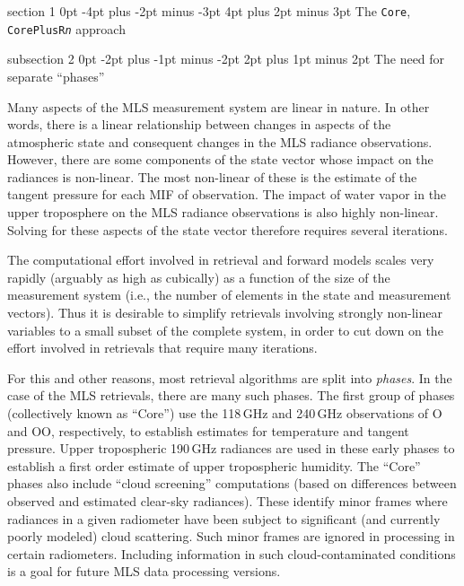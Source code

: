 \documentclass[11pt,draft]{report}
\makeatletter
\renewcommand{\section}{\@startsection%
  {section}%
  {1}%
  {0pt}%
  {-4pt plus -2pt minus -3pt}%
  {4pt plus 2pt minus 3pt}%
  {\Large\sffamily\fontseries{sb}\selectfont\flushleft\color{SectionColor}\figureversion{tabular}}}%
\renewcommand{\subsection}{\@startsection%
  {subsection}%
  {2}%
  {0pt}%
  {-2pt plus -1pt minus -2pt}%
  {2pt plus 1pt minus 2pt}%
  {\large\sffamily\fontseries{sb}\selectfont\flushleft\color{SectionColor}\figureversion{tabular}}}%
\makeatother
\begin{document}
\section{The \texttt{Core}, \texttt{CorePlusR\emph{n}} approach}

\subsection{The need for separate ``phases''}

Many aspects of the MLS measurement system are linear in nature.  In
other words, there is a linear relationship between changes in aspects
of the atmospheric state and consequent changes in the MLS radiance
observations.  However, there are some components of the state vector
whose impact on the radiances is non-linear.  The most non-linear of
these is the estimate of the tangent pressure for each MIF of
observation.  The impact of water vapor in the upper troposphere on the
MLS radiance observations is also highly non-linear.  Solving for these
aspects of the state vector therefore requires several iterations.

The computational effort involved in retrieval and forward models scales
very rapidly (arguably as high as cubically) as a function of the size
of the measurement system (i.e., the number of elements in the state and
measurement vectors).  Thus it is desirable to simplify retrievals
involving strongly non-linear variables to a small subset of the
complete system, in order to cut down on the effort involved in
retrievals that require many iterations.

For this and other reasons, most retrieval algorithms are split into
\emph{phases}.  In the case of the MLS \thisv retrievals, there are many
such phases.  The first group of phases (collectively known as ``Core'')
use the 118\,GHz and 240\,GHz observations of O and OO,
respectively, to establish estimates for temperature and tangent
pressure.  Upper tropospheric 190\,GHz radiances are used in these early
phases to establish a first order estimate of upper tropospheric
humidity.  The ``Core'' phases also include ``cloud screening''
computations (based on differences between observed and estimated
clear-sky radiances).  These identify minor frames where radiances in a
given radiometer have been subject to significant (and currently poorly
modeled) cloud scattering.  Such minor frames are ignored in \thisv
processing in certain radiometers.  Including information in such
cloud-contaminated conditions is a goal for future MLS data processing
versions.
\end{document}
